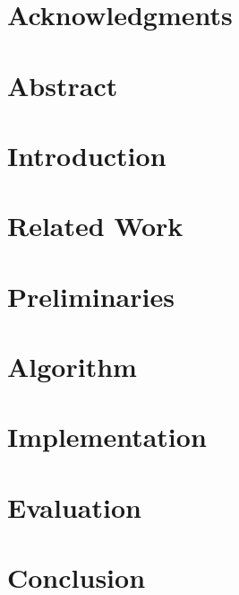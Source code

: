 \documentclass[a4paper,11pt,twoside,openright]{WCarticle}
\begin{document}

\tpage
\pagestyle{plain}

\chapter*{Acknowledgments}


\chapter*{Abstract} 


\tableofcontents
\listoffigures
\listoftables

\cleardoublepage
\pagestyle{fancy}

\chapter{Introduction} \label{chap:intro}


\chapter{Related Work} \label{chap:backgrd}




\chapter{Preliminaries} \label{chap:prelim}%



\chapter{Algorithm} \label{chap:alg}


\chapter{Implementation} \label{chap:impl}

\chapter{Evaluation} \label{chap:eval}


\chapter{Conclusion} \label{chap:conclusion}



\end{document}
